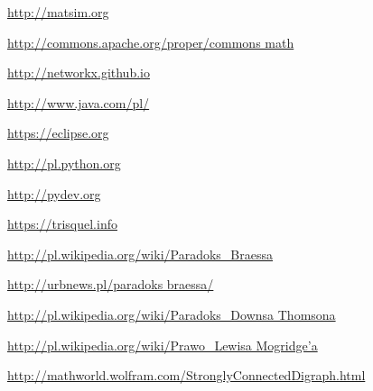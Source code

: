 \documentclass[twoside,12pt]{report}
\let\oldsection\chapter
\def\chapter{\cleardoublepage\oldsection}
\begin{document}
\begin{thebibliography}{99}
	\url{http://matsim.org}	

	\url{http://commons.apache.org/proper/commons math}
	
	\url{http://networkx.github.io}

	\url{http://www.java.com/pl/}

	\url{https://eclipse.org}
				
	\url{http://pl.python.org}
	
	\url{http://pydev.org}
	
	\url{https://trisquel.info}
			
	\url{http://pl.wikipedia.org/wiki/Paradoks_Braessa}
	
	\url{http://urbnews.pl/paradoks braessa/}
	
	\url{http://pl.wikipedia.org/wiki/Paradoks_Downsa Thomsona}
	
	\href{http://pl.wikipedia.org/wiki/Prawo_Lewisa Mogridge\%E2\%80\%99a}
	    {http://pl.wikipedia.org/wiki/Prawo\_Lewisa Mogridge\textquoteright{}a}
	   
	\url{http://mathworld.wolfram.com/StronglyConnectedDigraph.html}

\end{thebibliography}

\cleardoublepage
{}
{}

\blindtext[4]
\end{document}
